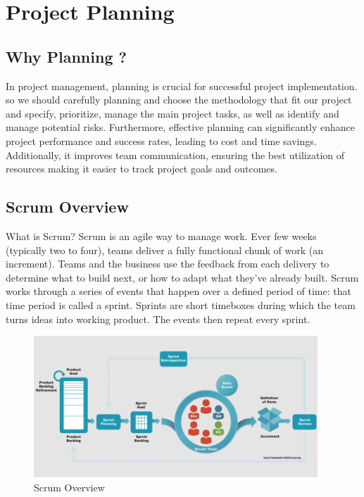 \chapter{Project Planning}

\section{Why Planning ?}
In project management, planning is crucial for successful project implementation. so we should carefully planning and choose the methodology that fit our project and specify, prioritize, manage the main project tasks, as well as identify and manage potential risks.
Furthermore, effective planning can significantly enhance project performance and success rates, leading to cost and time savings. Additionally, it improves team communication, ensuring the best utilization of resources making it easier to track project goals and outcomes.

\section{Scrum Overview}
What is Scrum? Scrum is an agile way to manage work. Ever few weeks (typically two to four), teams deliver a fully functional chunk of work (an increment). Teams and the business use the feedback from each delivery to determine what to build next, or how to adapt what they've already built.
Scrum works through a series of events that happen over a defined period of time: that time period is called a sprint. Sprints are short timeboxes during which the team turns ideas into working product. The events then repeat every sprint.

\begin{figure}[h!]
	\centering
	\includegraphics[width=0.95\textwidth]{figures/scrum-overview.png}
	\caption{Scrum Overview}
\end{figure}

